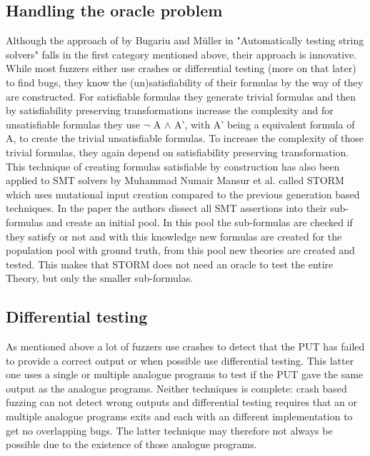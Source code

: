 \subsection{Handling the oracle problem}
\label{cha:2:handelingOracelproblem}
Although the approach of by Bugariu and M\"uller in "Automatically testing string solvers"\cite{9bugariu2020automaticallyTestingStringSolvers} falls in the first category mentioned above, their approach is innovative. While most fuzzers either use crashes or differential testing (more on that later) to find bugs, they know the (un)satisfiability of their formulas by the way of they are constructed. For satisfiable formulas they generate trivial formulas and then by satisfiability preserving transformations increase the complexity and for unsatisfiable formulas they use $\neg$ A $\land$ A', with A' being a equivalent formula of A, to create the trivial unsatisfiable formulas. To increase the complexity of those trivial formulas, they again depend on satisfiability preserving transformation. This technique of creating formulas satisfiable by construction has also been applied to SMT solvers by Muhammad Numair Mansur et al. called STORM\cite{1mansur2020detecting} which uses mutational input creation compared to the previous generation based techniques. In the paper the authors dissect all SMT assertions into their sub-formulas and create an initial pool. In this pool the sub-formulas are checked if they satisfy or not and with this knowledge new formulas are created for the population pool with ground truth, from this pool new theories are created and tested. This makes that STORM does not need an oracle to test the entire Theory, but only the smaller sub-formulas.

\subsection{Differential testing}
\label{cha:2:Differential}
As mentioned above a lot of fuzzers use crashes to detect that the PUT has failed to provide a correct output or when possible use differential testing. This latter one uses a single or multiple analogue programs to test if the PUT gave the same output as the analogue programs. Neither techniques is complete: crash based fuzzing can not detect wrong outputs and differential testing requires that an or multiple analogue programs exits and each with an different implementation to get no overlapping bugs. The latter technique may therefore not always be possible due to the existence of those analogue programs.


